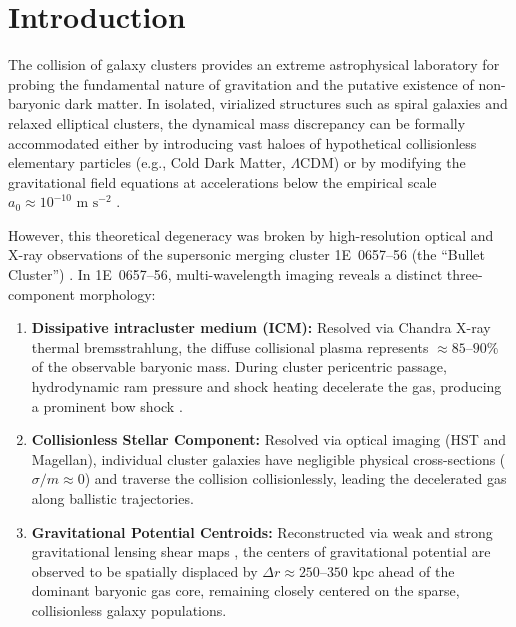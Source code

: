 \documentclass[aps,prd,reprint,superscriptaddress,nofootinbib,floatfix,amsmath,amssymb]{revtex4-2}
\begin{document}

\maketitle

\section{Introduction}
\label{sec:intro}

The collision of galaxy clusters provides an extreme astrophysical laboratory for probing the fundamental nature of gravitation and the putative existence of non-baryonic dark matter. In isolated, virialized structures such as spiral galaxies and relaxed elliptical clusters, the dynamical mass discrepancy can be formally accommodated either by introducing vast haloes of hypothetical collisionless elementary particles (e.g., Cold Dark Matter, $\Lambda\text{CDM}$) or by modifying the gravitational field equations at accelerations below the empirical scale $a_0 \approx 10^{-10}\text{ m s}^{-2}$ \cite{Milgrom1983,Bekenstein2004,Moffat2006_MOG}.

However, this theoretical degeneracy was broken by high-resolution optical and X-ray observations of the supersonic merging cluster 1E~0657--56 (the ``Bullet Cluster'') \cite{Markevitch2004_Bullet,Clowe2006_Bullet,Bradac2006_Bullet}. In 1E~0657--56, multi-wavelength imaging reveals a distinct three-component morphology:
\begin{enumerate}
    \item \textbf{Dissipative intracluster medium (ICM):} Resolved via Chandra X-ray thermal bremsstrahlung, the diffuse collisional plasma represents $\approx 85\text{--}90\%$ of the observable baryonic mass. During cluster pericentric passage, hydrodynamic ram pressure and shock heating decelerate the gas, producing a prominent bow shock \cite{Markevitch2004_Bullet}.
    \item \textbf{Collisionless Stellar Component:} Resolved via optical imaging (HST and Magellan), individual cluster galaxies have negligible physical cross-sections ($\sigma / m \approx 0$) and traverse the collision collisionlessly, leading the decelerated gas along ballistic trajectories.
    \item \textbf{Gravitational Potential Centroids:} Reconstructed via weak and strong gravitational lensing shear maps \cite{Clowe2006_Bullet,Bradac2006_Bullet,Paraficz2016}, the centers of gravitational potential are observed to be spatially displaced by $\Delta r \approx 250\text{--}350\text{ kpc}$ ahead of the dominant baryonic gas core, remaining closely centered on the sparse, collisionless galaxy populations.
\end{enumerate}
\end{document}
